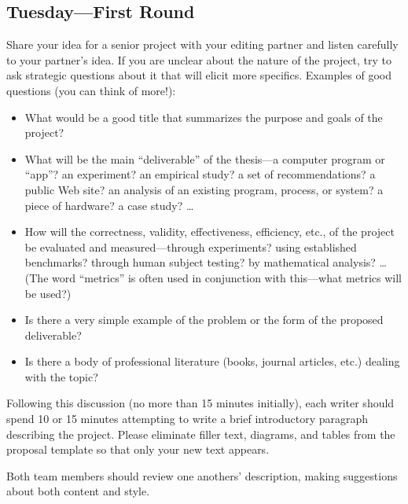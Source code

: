 \subsection*{Tuesday---First Round}
 Share your idea for a senior project with your editing
partner and listen carefully to your partner's idea. If you are unclear about
the nature of the project, try to ask strategic questions about it that will 
elicit more specifics. Examples of good questions (you can think of more!):
\begin{itemize}
\item
What would be a good title that summarizes the purpose and goals of the project?
\item
What will be the main ``deliverable'' of the thesis---a computer program or
``app''? an
experiment? an empirical study? a set of recommendations? a 
public Web site? an analysis of an existing program, process, or system?
a piece of hardware? a case study? \ldots
\item
How will the correctness, validity, effectiveness, efficiency, etc., of the
project be
evaluated and measured---through experiments? using established benchmarks?
through human subject testing? by mathematical analysis? \ldots (The word
``metrics'' is often used in conjunction with this---what
metrics will be used?)
\item
Is there a very simple example of the problem or the form 
of the proposed deliverable?
\item
Is there a body of professional literature (books, journal articles, etc.)
dealing with the topic?
\end{itemize}

Following this discussion (no more than 15 minutes initially), each writer
should spend 10 or 15 minutes attempting to write a brief introductory 
paragraph describing the project.
Please eliminate filler text, diagrams, and tables from the 
proposal template so that only your new text appears.

 Both team members should review one anothers' 
description, making suggestions about both content and style. 


